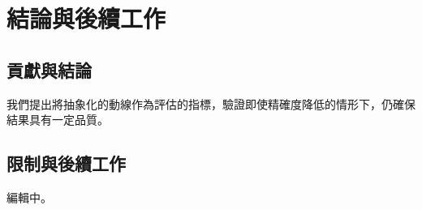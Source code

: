 \chapter{結論與後續工作}
\label{cha:conclusions}

\section{貢獻與結論}

我們提出將抽象化的動線作為評估的指標，驗證即使精確度降低的情形下，仍確保結果具有一定品質。

\section{限制與後續工作} 

編輯中。

